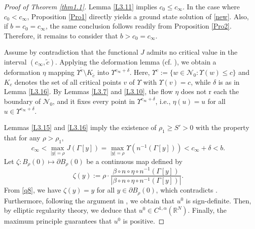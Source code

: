 \documentclass[10pt,a4paper]{amsart}
\numberwithin{equation}{section}
\begin{document}
\begin{proof}[Proof of Theorem \ref{thm1.1}]
 Lemma \ref{L3.11} implies \(c_0 \leq c_\infty\). In the case where \(c_0 < c_\infty\), Proposition \ref{Pro1} directly yields a ground state solution of \eqref{new}. 
 Also, if  $b = c_0 = c_\infty$, the same conclusion follows  readily from Proposition \ref{Pro2}. Therefore, it remains to consider that $b>c_0=c_\infty$.

Assume by contradiction that the functional $J$  admits no critical value in the interval 
$(c_\infty ,\tilde{c})$.  Applying the deformation lemma (cf. \cite[p.86]{Struwe}), 
we obtain a deformation \(\eta\) mapping 
\(\Upsilon^{\tilde{c}} \setminus K_{\tilde{c}}\) into \(\Upsilon^{c_\infty + \delta}\). 
Here, \(\Upsilon^{c} := \{ w \in \mathcal{N}_0 : \Upsilon(w) \leq c \}\) and \(K_c\) denotes 
the set of all critical points $v$ of \(\Upsilon\) with \(\Upsilon(v)=c\), while \(\delta\) 
is as in Lemma \ref{L3.16}.  By Lemmas \ref{L3.7} and \ref{L3.10}, the flow \(\eta\) does not r
each the boundary of \(\mathcal{N}_0\), and it fixes every point in 
\(\Upsilon^{c_\infty + \delta}\), i.e., \(\eta(u) = u\) for all \(u \in \Upsilon^{c_\infty + \delta}\).

Lemmas \ref{L3.15} and \ref{L3.16} imply the existence of \(\rho_1 \geq S' > 0\) with the 
property that for any \(\rho > \rho_1\),
$$
c_\infty<\max_{|y|=\rho}J(\Gamma[y])=\max_{|y|=\rho}\Upsilon(n^{-1}(\Gamma[y]))<c_\infty+\delta<b.
$$
Let $\zeta: B_\rho(0)\mapsto \partial B_\rho(0)$ be a continuous map defined by
$$
\zeta(y):=\rho\cdot\frac{\beta\circ n\circ \eta \circ n^{-1}(\Gamma[y])}{|\beta\circ n\circ \eta \circ n^{-1}(\Gamma[y])|}.
$$ 
From \eqref{q8}, we have $\zeta(y)=y$ for all $y\in\partial B_\rho(0)$, which contradicts 
 \cite[D.11]{Willem}. Furthermore, following the argument in 
 \cite[Lemma 2.4]{Clapp}, we obtain that $u^0$  is sign-definite.  
 Then, by elliptic regularity theory, we deduce that $u^0\in C^{1,\alpha}({\mathbb{R}^N})$. 
 Finally, the maximum principle guarantees that  $u^0$ is positive. 
 \end{proof}
\end{document}
